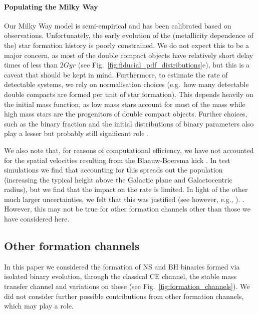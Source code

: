 \paragraph{Populating the Milky Way} Our Milky Way model is semi-empirical and has been calibrated based on observations. Unfortunately, the early evolution of the (metallicity dependence of the) star formation history is poorly constrained. We do not expect this to be a major concern, as most of the double compact objects have relatively short delay times of less than $2 \unit{Gyr}$ (see Fig.~\ref{fig:fiducial_pdf_distributions}e), but this is a caveat that should be kept in mind. Furthermore, to estimate the rate of detectable systems, we rely on normalisation choices (e.g.\ how many detectable double compacts are formed per unit of star formation). This depends heavily on the initial mass function, as low mass stars account for most of the mass while high mass stars are the progenitors of double compact objects. Further choices, such as the binary fraction and the initial distributions of binary parameters also play a lesser but probably still significant role \citet[e.g.][]{deMink+2015, Chruslinska+2017, Klencki+2018}. 

We also note that, for reasons of computational efficiency, we have not accounted for the spatial velocities resulting from the Blaauw-Boersma kick \citep{Blaauw+1961,Boersma1961}. In test simulations we find that accounting for this spreads out the population (increasing the typical height above the Galactic plane and Galactocentric radius), but we find that the impact on the rate is limited. In light of the other much larger uncertainties, we felt that this was justified (see however, e.g., \citealt{Brandt+1995, Abbott+2017_GW170817_progenitor}). . However, this may not be true for other formation channels other than those we have considered here.

\subsection{Other formation channels}\label{sec:other_formation_channels}

In this paper we considered the formation of NS and BH binaries formed via isolated binary evolution, through the classical CE channel, the stable mass transfer channel and variations on these (see Fig.~\ref{fig:formation_channels}). We did not consider further possible contributions from other formation channels, which may play a role.

